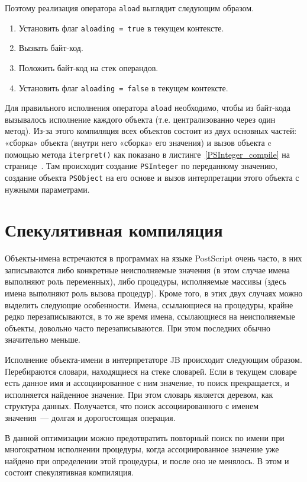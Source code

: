 	Поэтому реализация оператора \texttt{aload} выглядит следующим образом.
	\begin{enumerate}
		\item Установить флаг \texttt{aloading\,=\,true}  в текущем контексте.
		\item Вызвать байт-код.
		\item Положить байт-код на стек операндов.
		\item Установить флаг \texttt{aloading\,=\,false} в текущем контексте.
	\end{enumerate}
	
	Для правильного исполнения оператора \texttt{aload} необходимо, чтобы из байт-кода вызывалось исполнение каждого объекта (т.е. централизованно через один метод). Из-за этого компиляция всех объектов состоит из двух основных частей: «сборка» объекта (внутри него «сборка» его значения) и вызов объекта c помощью метода \texttt{iterpret()} как показано в листинге~\ref{PSInteger_compile} на странице~\pageref{PSInteger_compile}. Там происходит  создание \texttt{PSInteger} по переданному значению, создание объекта \texttt{PSObject} на его основе и вызов интерпретации этого объекта с нужными параметрами. 

	\section{Спекулятивная компиляция}
	Объекты-имена встречаются в программах на языке PostScript очень часто, в них записываются либо конкретные неисполняемые значения (в этом случае имена выполняют роль переменных), либо процедуры, исполняемые массивы (здесь имена выполняют роль вызова процедур). Кроме того, в этих двух случаях можно выделить следующие особенности. Имена, ссылающиеся на процедуры, крайне редко перезаписываются, в то же время имена, ссылающиеся на неисполняемые объекты, довольно часто перезаписываются. При этом последних обычно значительно меньше.
	
	Исполнение объекта-имени в интерпретаторе JB происходит следующим образом. Перебираются словари, находящиеся на стеке словарей. Если в текущем словаре есть данное имя и ассоциированное с ним значение, то поиск прекращается, и исполняется найденное значение. При этом словарь является деревом, как структура данных. Получается, что поиск ассоциированного с именем значения~--- долгая и дорогостоящая операция. 
	
	В данной оптимизации можно предотвратить повторный поиск по имени при многократном исполнении процедуры, когда  ассоциированное значение уже найдено при определении этой процедуры, и после оно не менялось. В этом и состоит спекулятивная компиляция.
	
